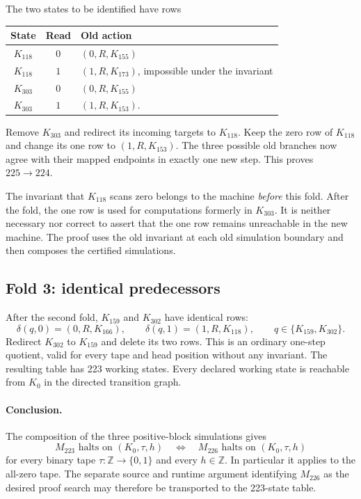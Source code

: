 The two states to be identified have rows
\begin{center}
\begin{tabular}{ccl}
State & Read & Old action\\
\hline
$K_{118}$ & $0$ & $(0,R,K_{155})$\\
$K_{118}$ & $1$ & $(1,R,K_{173})$, impossible under the invariant\\
$K_{303}$ & $0$ & $(0,R,K_{155})$\\
$K_{303}$ & $1$ & $(1,R,K_{153})$.
\end{tabular}
\end{center}
Remove $K_{303}$ and redirect its incoming targets to $K_{118}$.  Keep the
zero row of $K_{118}$ and change its one row to $(1,R,K_{153})$.
The three possible old branches now agree with their mapped endpoints in
exactly one new step.  This proves $225\longrightarrow224$.

The invariant that $K_{118}$ scans zero belongs to the machine \emph{before}
this fold.  After the fold, the one row is used for computations formerly
in $K_{303}$.  It is neither necessary nor correct to assert that the one
row remains unreachable in the new machine.  The proof uses the old
invariant at each old simulation boundary and then composes the certified
simulations.

\subsection{Fold 3: identical predecessors}

After the second fold, $K_{159}$ and $K_{302}$ have identical rows:
\[
 \delta(q,0)=(0,R,K_{166}),\qquad
 \delta(q,1)=(1,R,K_{118}),\qquad q\in\{K_{159},K_{302}\}.
\]
Redirect $K_{302}$ to $K_{159}$ and delete its two rows.  This is an ordinary
one-step quotient, valid for every tape and head position without any
invariant.  The resulting table has 223 working states.  Every declared
working state is reachable from $K_0$ in the directed transition graph.

\paragraph{Conclusion.}
The composition of the three positive-block simulations gives
\[
 M_{223}\text{ halts on }(K_0,\tau,h)
 \quad\Longleftrightarrow\quad
 M_{226}\text{ halts on }(K_0,\tau,h)
\]
for every binary tape $\tau:\mathbb Z\to\{0,1\}$ and every $h\in\mathbb Z$.
In particular it applies to the all-zero tape.  The separate source and
runtime argument identifying $M_{226}$ as the desired proof search may
therefore be transported to the 223-state table.

